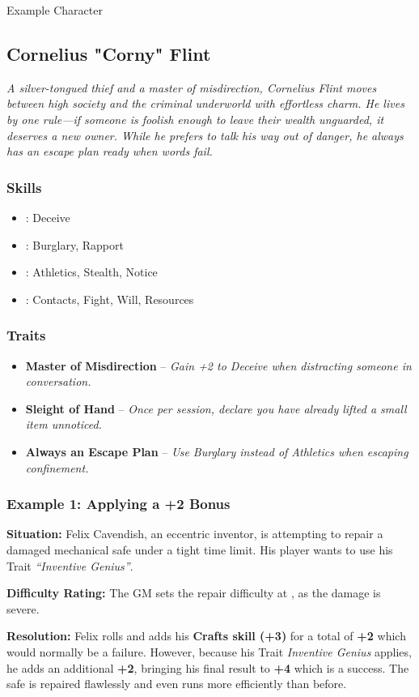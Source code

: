\begin{DndSidebar}[float=!b]{Example Character}
	\subsection{Cornelius "Corny" Flint}
	\emph{A silver-tongued thief and a master of misdirection, Cornelius Flint moves between high society and the criminal underworld with effortless charm. He lives by one rule—if someone is foolish enough to leave their wealth unguarded, it deserves a new owner. While he prefers to talk his way out of danger, he always has an escape plan ready when words fail.}

	\subsubsection*{Skills}
	\begin{itemize}
    	\item \Expert: Deceive
	    \item \Skilled: Burglary, Rapport
    	\item \Novice: Athletics, Stealth, Notice
	    \item \Untrained: Contacts, Fight, Will, Resources
	\end{itemize}

	\subsubsection*{Traits}
	\begin{itemize}
    	\item \textbf{Master of Misdirection} – \emph{Gain +2 to Deceive when distracting someone in conversation.}
	    \item \textbf{Sleight of Hand} – \emph{Once per session, declare you have already lifted a small item unnoticed.}
	    \item \textbf{Always an Escape Plan} – \emph{Use Burglary instead of Athletics when escaping confinement.}
	\end{itemize}
\end{DndSidebar}

\subsubsection{Example 1: Applying a +2 Bonus}
\begin{DndReadAloud}{}
	\textbf{Situation:} Felix Cavendish, an eccentric inventor, is attempting to repair a damaged mechanical safe under a tight time limit. His player wants to use his Trait \emph{“Inventive Genius”}.

	\noindent\textbf{Difficulty Rating:} The GM sets the repair difficulty at \Arduous, as the damage is severe.

    \noindent\textbf{Resolution:} Felix rolls  and adds his \textbf{Crafts skill (+3)} for a total of \textbf{+2} which would normally be a failure. However, because his Trait \emph{Inventive Genius} applies, he adds an additional \textbf{+2}, bringing his final result to \textbf{+4} which is a success. The safe is repaired flawlessly and even runs more efficiently than before.
\end{DndReadAloud}

